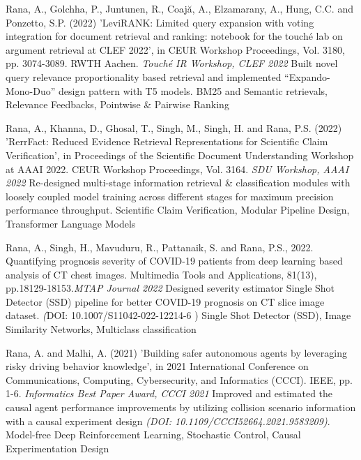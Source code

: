 \begin{projects}
	\project
	{Rana, A., Golchha, P., Juntunen, R., Coajă, A., Elzamarany, A., Hung, C.C. and Ponzetto, S.P. (2022) 'LeviRANK: Limited query expansion with voting integration for document retrieval and ranking: notebook for the touché lab on argument retrieval at CLEF 2022', in CEUR Workshop Proceedings, Vol. 3180, pp. 3074-3089. RWTH Aachen.}{ \textit{Touch\'e IR Workshop, CLEF 2022} }
	{
	}
	{Built novel query relevance proportionality based retrieval and implemented ``Expando-Mono-Duo'' design pattern with T5 models.}
	{BM25 and Semantic retrievals, Relevance Feedbacks, Pointwise \& Pairwise Ranking}
	
	\project
	{Rana, A., Khanna, D., Ghosal, T., Singh, M., Singh, H. and Rana, P.S. (2022) 'RerrFact: Reduced Evidence Retrieval Representations for Scientific Claim Verification', in Proceedings of the Scientific Document Understanding Workshop at AAAI 2022. CEUR Workshop Proceedings, Vol. 3164.}{ \textit{SDU Workshop, AAAI 2022} }
	{
	}
	{Re-designed multi-stage information retrieval \& classification modules with loosely coupled model training across different stages for maximum precision performance throughput.}
	{Scientific Claim Verification, Modular Pipeline Design, Transformer Language Models}


    \project
	{Rana, A., Singh, H., Mavuduru, R., Pattanaik, S. and Rana, P.S., 2022. Quantifying prognosis severity of COVID-19 patients from deep learning based analysis of CT chest images. Multimedia Tools and Applications, 81(13), pp.18129-18153.}{\textit{MTAP Journal 2022}}
    	{
	}
	{Designed severity estimator Single Shot Detector (SSD) pipeline for better COVID-19 prognosis on CT slice image dataset. \textit(DOI: 10.1007/S11042-022-12214-6
)}
	{Single Shot Detector (SSD), Image Similarity Networks, Multiclass classification}

    
	\project
	{Rana, A. and Malhi, A. (2021) 'Building safer autonomous agents by leveraging risky driving behavior knowledge', in 2021 International Conference on Communications, Computing, Cybersecurity, and Informatics (CCCI). IEEE, pp. 1-6.}{ \textit{Informatics Best Paper Award, CCCI 2021} }
	{
	}
	{Improved and estimated the causal agent performance improvements by utilizing collision scenario information with a causal experiment design \textit{(DOI: 10.1109/CCCI52664.2021.9583209)}.}
	{Model-free Deep Reinforcement Learning, Stochastic Control, Causal Experimentation Design}



\end{projects}
